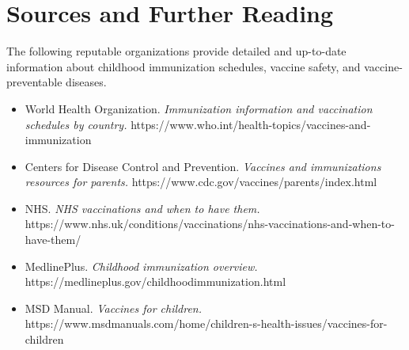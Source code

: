 \section*{Sources and Further Reading}
The following reputable organizations provide detailed and up-to-date information about childhood immunization schedules, vaccine safety, and vaccine-preventable diseases.
\begin{itemize}
    \item World Health Organization. \textit{Immunization information and vaccination schedules by country.} https://www.who.int/health-topics/vaccines-and-immunization
    \item Centers for Disease Control and Prevention. \textit{Vaccines and immunizations resources for parents.} https://www.cdc.gov/vaccines/parents/index.html
    \item NHS. \textit{NHS vaccinations and when to have them.} https://www.nhs.uk/conditions/vaccinations/nhs-vaccinations-and-when-to-have-them/
    \item MedlinePlus. \textit{Childhood immunization overview.} https://medlineplus.gov/childhoodimmunization.html
    \item MSD Manual. \textit{Vaccines for children.} https://www.msdmanuals.com/home/children-s-health-issues/vaccines-for-children
\end{itemize}
